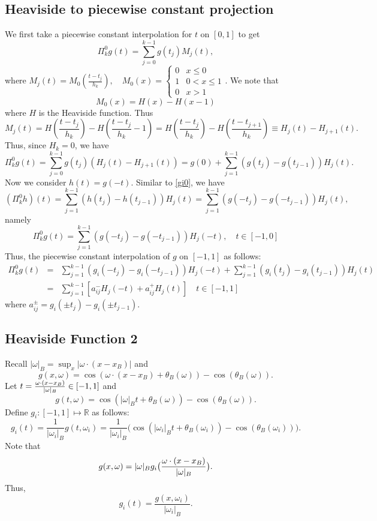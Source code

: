 \subsection{Heaviside to piecewise constant projection}
We first take a piecewise constant interpolation for $t$ on $[0,1]$ to get
$$
\Pi_k^0 g (t)=\sum_{j=0}^{k-1}g(t_j) M_j(t),   
$$
where 
$ 
	M_j(t)=M_0(\frac{t-t_j}{h_k}),
	\quad 
	M_0(x)=
	\left\{
	\begin{array}{ll}
		0 & x\le0 \\
		1 & 0< x\le1    \\
		0 & x > 1    
	\end{array}.
	\right.
$
We note that
$$
M_0(x)=H(x)-H(x-1)
$$
where $H$ is the Heaviside function.
Thus
$$
M_j(t)
=H(\frac{t-t_{j}}{h_k})-H(\frac{t-t_{j}}{h_k}-1)=H(\frac{t-t_{j}}{h_k})-H(\frac{t-t_{j+1}}{h_k})
\equiv H_{j}(t)-H_{j+1}(t).
$$
Thus, since $H_k=0$, we have
\begin{equation}  \label{gi0}
\Pi_k^0 g(t)=\sum_{j=0}^{k-1}g(t_j) (H_{j}(t)-H_{j+1}(t))
	=g(0) + \sum_{j=1}^{k-1}(g(t_j) - g(t_{j-1})) H_{j}(t).
\end{equation}
Now we consider
$ h(t) = g(-t)$.
Similar to \eqref{gi0}, we have
$$
(\Pi_k^0 h)(t)=\sum_{j=1}^{k-1}(h(t_j) - h(t_{j-1}))H_j(t)
=\sum_{j=1}^{k-1}(g(-t_j) - g(-t_{j-1}))H_j(t),
$$
namely 
\begin{equation}\label{gi1}
	\Pi_k^0 g(t)=\sum_{j=1}^{k-1}(g(-t_j) - g(-t_{j-1}))H_j(-t), \quad t\in [-1,0]
\end{equation}
Thus, the piecewise constant
interpolation of $g$ on $[-1,1]$ as follows:
\begin{eqnarray}
	\Pi_k^0 g(t)&=&
	\sum_{j=1}^{k-1}(g_i(-t_j) - g_i(-t_{j-1}))H_j(-t)+\sum_{j=1}^{k-1}(g_i(t_j) - g_i(t_{j-1})) H_{j}(t)\nonumber \\ 
	&=&\sum_{j=1}^{k-1}[a_{ij}^-H_j(-t)+a_{ij}^+H_{j}(t)]  \label{gih0}
	\quad t\in [-1,1]
\end{eqnarray}
where 
$
a_{ij}^{\pm}=g_i(\pm t_j) - g_i(\pm t_{j-1}).
$


\subsection{Heaviside Function 2}
Recall $|\omega|_B=\sup_{x} |\omega \cdot (x-x_B)|$ and
$$
g(x,\omega) = \cos (\omega\cdot (x-x_B) +\theta_B(\omega)) - \cos(\theta_B(\omega)).
$$
Let $t={\omega\cdot (x-x_B)\over |\omega|_B}\in [-1, 1]$ and 
$$
g(t, \omega)= \cos(|\omega|_Bt+\theta_B(\omega))  -\cos(\theta_B(\omega)).
$$
Define $g_i: [-1,1]\mapsto \mathbb R$ as
follows:
\begin{equation}
\label{psi}
g_i(t)=\frac{1}{|\omega_i|_B}g(t,\omega_i)=\frac{1}{|\omega_i|_B}\big (\cos(|\omega_i|_Bt+\theta_B(\omega_i))  -\cos(\theta_B(\omega_i))\big ).
\end{equation}
Note that
$$
g(x,\omega) = |\omega|_B g_i\big ({\omega\cdot (x-x_B)\over |\omega|_B}\big ).
$$
Thus,
$$
g_i(t)=\frac{g(x,\omega_i)}{|\omega_i|_B}.
$$

